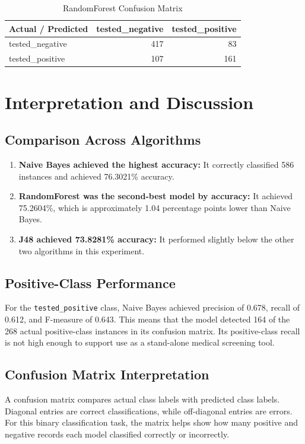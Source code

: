 \documentclass[11pt,a4paper]{article}
\begin{document}
\begin{table}[H]
\centering
\small
\caption{RandomForest Confusion Matrix}
\label{tab:rfcm}
\begin{tabular}{lrr}
\toprule
\textbf{Actual / Predicted} & \textbf{tested\_negative} & \textbf{tested\_positive} \\
\midrule
tested\_negative & 417 & 83 \\
tested\_positive & 107 & 161 \\
\bottomrule
\end{tabular}
\end{table}

\section{Interpretation and Discussion}
\subsection{Comparison Across Algorithms}
\begin{enumerate}
    \item \textbf{Naive Bayes achieved the highest accuracy:} It correctly classified 586 instances and achieved 76.3021\% accuracy.
    \item \textbf{RandomForest was the second-best model by accuracy:} It achieved 75.2604\%, which is approximately 1.04 percentage points lower than Naive Bayes.
    \item \textbf{J48 achieved 73.8281\% accuracy:} It performed slightly below the other two algorithms in this experiment.
\end{enumerate}

\subsection{Positive-Class Performance}
For the \texttt{tested\_positive} class, Naive Bayes achieved precision of 0.678, recall of 0.612, and F-measure of 0.643. This means that the model detected 164 of the 268 actual positive-class instances in its confusion matrix. Its positive-class recall is not high enough to support use as a stand-alone medical screening tool.

\subsection{Confusion Matrix Interpretation}
A confusion matrix compares actual class labels with predicted class labels. Diagonal entries are correct classifications, while off-diagonal entries are errors. For this binary classification task, the matrix helps show how many positive and negative records each model classified correctly or incorrectly.
\end{document}
